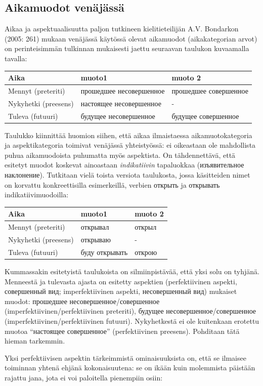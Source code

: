 \documentclass[]{scrartcl}
\begin{document}
\subsection{Aikamuodot venäjässä}\label{aikamuodot-venuxe4juxe4ssuxe4}

Aikaa ja aspektuaalisuutta paljon tutkineen kielitieteilijän A.V.
Bondarkon (2005: 261) mukaan venäjässä käytössä olevat aikamuodot
(aikakategorian arvot) on perinteisimmän tulkinnan mukaisesti jaettu
seuraavan taulukon kuvaamalla tavalla:

\begin{longtable}[c]{@{}lll@{}}
\toprule
Aika & muoto1 & muoto 2\tabularnewline
\midrule
\endhead
Mennyt (preteriti) & прошедшее несовершенное & прошедшее
совершенное\tabularnewline
Nykyhetki (preesens) & настоящее несовершенное & -\tabularnewline
Tuleva (futuuri) & будущее несовершенное & будущее
совершенное\tabularnewline
\bottomrule
\end{longtable}

Taulukko kiinnittää huomion siihen, että aikaa ilmaistaessa
aikamuotokategoria ja aspektikategoria toimivat venäjässä yhteistyössä:
ei oikeastaan ole mahdollista puhua aikamuodoista puhumatta myös
aspektista. On tähdennettävä, että esitetyt muodot koskevat ainoastaan
\emph{indikatiivin} tapaluokkaa (изъявительное наклонение). Tutkitaan
vielä toista versiota taulukosta, jossa käsitteiden nimet on korvattu
konkreettisilla esimerkeillä, verbien открыть ja открывать
indikatiivimuodoilla:

\begin{longtable}[c]{@{}lll@{}}
\toprule
Aika & muoto1 & muoto 2\tabularnewline
\midrule
\endhead
Mennyt (preteriti) & открывал & открыл\tabularnewline
Nykyhetki (preesens) & открываю & -\tabularnewline
Tuleva (futuuri) & буду открывать & открою\tabularnewline
\bottomrule
\end{longtable}

Kummassakin esitetyistä taulukoista on silmiinpistävää, että yksi solu
on tyhjänä. Menneestä ja tulevasta ajasta on esitetty aspektien
(perfektiivinen aspekti, совершенный вид; imperfektiivinen aspekti,
несовершенный вид) mukaiset muodot: прошедшее несовершенное/совершенное
(imperfektiivinen/perfektiivinen preteriti), будущее
несовершенное/совершенное (imperfektiivinen/perfektiivinen futuuri).
Nykyhetkestä ei ole kuitenkaan erotettu muotoa ``настоящее совершенное''
(perfektiivinen preesens). Pohditaan tätä hieman tarkemmin.

Yksi perfektiivisen aspektin tärkeimmistä ominaisuuksista on, että se
ilmaisee toiminnan yhtenä ehjänä kokonaisuutena: se on ikään kuin
molemmista päistään rajattu jana, jota ei voi paloitella pienempiin
osiin:
\end{document}
